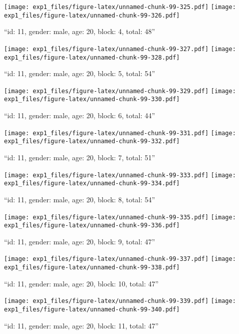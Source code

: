 \documentclass[,]{article}
\begin{document}
\texttt{[image: exp1\_files/figure-latex/unnamed-chunk-99-325.pdf]}
\texttt{[image: exp1\_files/figure-latex/unnamed-chunk-99-326.pdf]}

\newpage
[1] 

``id: 11, gender: male, age: 20, block: 4, total: 48''

\texttt{[image: exp1\_files/figure-latex/unnamed-chunk-99-327.pdf]}
\texttt{[image: exp1\_files/figure-latex/unnamed-chunk-99-328.pdf]}

\newpage
[1] 

``id: 11, gender: male, age: 20, block: 5, total: 54''

\texttt{[image: exp1\_files/figure-latex/unnamed-chunk-99-329.pdf]}
\texttt{[image: exp1\_files/figure-latex/unnamed-chunk-99-330.pdf]}

\newpage
[1] 

``id: 11, gender: male, age: 20, block: 6, total: 44''

\texttt{[image: exp1\_files/figure-latex/unnamed-chunk-99-331.pdf]}
\texttt{[image: exp1\_files/figure-latex/unnamed-chunk-99-332.pdf]}

\newpage
[1] 

``id: 11, gender: male, age: 20, block: 7, total: 51''

\texttt{[image: exp1\_files/figure-latex/unnamed-chunk-99-333.pdf]}
\texttt{[image: exp1\_files/figure-latex/unnamed-chunk-99-334.pdf]}

\newpage
[1] 

``id: 11, gender: male, age: 20, block: 8, total: 54''

\texttt{[image: exp1\_files/figure-latex/unnamed-chunk-99-335.pdf]}
\texttt{[image: exp1\_files/figure-latex/unnamed-chunk-99-336.pdf]}

\newpage
[1] 

``id: 11, gender: male, age: 20, block: 9, total: 47''

\texttt{[image: exp1\_files/figure-latex/unnamed-chunk-99-337.pdf]}
\texttt{[image: exp1\_files/figure-latex/unnamed-chunk-99-338.pdf]}

\newpage
[1] 

``id: 11, gender: male, age: 20, block: 10, total: 47''

\texttt{[image: exp1\_files/figure-latex/unnamed-chunk-99-339.pdf]}
\texttt{[image: exp1\_files/figure-latex/unnamed-chunk-99-340.pdf]}

\newpage
[1] 

``id: 11, gender: male, age: 20, block: 11, total: 47''
\end{document}
